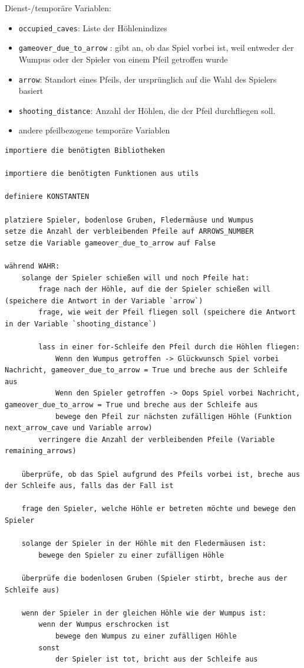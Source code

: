 \documentclass[
]{book}
\providecommand{\tightlist}{%
  \setlength{\itemsep}{0pt}\setlength{\parskip}{0pt}}
\begin{document}
Dienst-/temporäre Variablen:

\begin{itemize}
\tightlist
\item
  \texttt{occupied\_caves}: Liste der Höhlenindizes
\item
  \texttt{gameover\_due\_to\_arrow} : gibt an, ob das Spiel vorbei ist, weil entweder der Wumpus oder der Spieler von einem Pfeil getroffen wurde
\item
  \texttt{arrow}: Standort eines Pfeils, der ursprünglich auf die Wahl des Spielers basiert
\item
  \texttt{shooting\_distance}: Anzahl der Höhlen, die der Pfeil durchfliegen soll.
\item
  andere pfeilbezogene temporäre Variablen
\end{itemize}

\begin{verbatim}
importiere die benötigten Bibliotheken

importiere die benötigten Funktionen aus utils

definiere KONSTANTEN

platziere Spieler, bodenlose Gruben, Fledermäuse und Wumpus
setze die Anzahl der verbleibenden Pfeile auf ARROWS_NUMBER
setze die Variable gameover_due_to_arrow auf False

während WAHR:
    solange der Spieler schießen will und noch Pfeile hat:
        frage nach der Höhle, auf die der Spieler schießen will  (speichere die Antwort in der Variable `arrow`)
        frage, wie weit der Pfeil fliegen soll (speichere die Antwort in der Variable `shooting_distance`)
        
        lass in einer for-Schleife den Pfeil durch die Höhlen fliegen:
            Wenn den Wumpus getroffen -> Glückwunsch Spiel vorbei Nachricht, gameover_due_to_arrow = True und breche aus der Schleife aus
            Wenn den Spieler getroffen -> Oops Spiel vorbei Nachricht, gameover_due_to_arrow = True und breche aus der Schleife aus
            bewege den Pfeil zur nächsten zufälligen Höhle (Funktion next_arrow_cave und Variable arrow)
        verringere die Anzahl der verbleibenden Pfeile (Variable remaining_arrows)
        
    überprüfe, ob das Spiel aufgrund des Pfeils vorbei ist, breche aus der Schleife aus, falls das der Fall ist
        
    frage den Spieler, welche Höhle er betreten möchte und bewege den Spieler
    
    solange der Spieler in der Höhle mit den Fledermäusen ist: 
        bewege den Spieler zu einer zufälligen Höhle
    
    überprüfe die bodenlosen Gruben (Spieler stirbt, breche aus der Schleife aus)
    
    wenn der Spieler in der gleichen Höhle wie der Wumpus ist:
        wenn der Wumpus erschrocken ist
            bewege den Wumpus zu einer zufälligen Höhle
        sonst
            der Spieler ist tot, bricht aus der Schleife aus
\end{verbatim}
\end{document}
